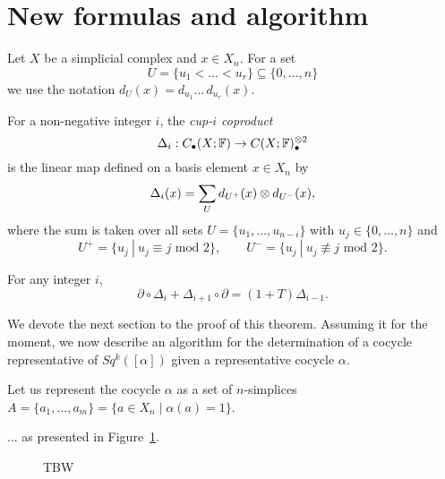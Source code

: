 
\section{New formulas and algorithm} \label{s:new stuff}

Let $X$ be a simplicial complex and $x \in X_n$. For a set
\begin{equation*}
U = \{u_1 < \dots < u_r\} \subseteq \{0, \dots, n\}
\end{equation*}
we use the notation $d_U(x) = d_{u_1} \ldots\, d_{u_r}(x)$.

\begin{definition} \label{d:cup-i coproducts}	
	For a non-negative integer $i$, the \textit{cup-$i$ coproduct}
	\begin{equation*}
	\Delta_i : C_\bullet(X; \mathbb{F}) \to C(X; \mathbb{F})^{\otimes 2}_\bullet
	\end{equation*}
	is the linear map defined on a basis element $x \in X_n$ by
	\begin{equation} \label{equation: simplicial cup-i coproducts}
	\Delta_i(x) = \sum_U d_{U^+}(x) \otimes d_{U^-}(x),
	\end{equation}
	where the sum is taken over all sets $U = \{u_1, \dots, u_{n-i}\}$ with $u_j \in \{0, \dots, n\}$ and
	\begin{equation*}
	U^+ = \{u_j\ |\ u_j \equiv j \text{ mod } 2\}, \qquad
	U^- = \{u_j\ |\ u_j \not\equiv j \text{ mod } 2\}.
	\end{equation*}
\end{definition}

\begin{theorem} \label{t:main theorem}
	For any integer $i$,
	\begin{equation} \label{eq: cup-i coproducts boundary relation}
	\partial \circ \Delta_{i} + \Delta_{i+1} \circ \partial = (1 +T ) \Delta_{i-1}.
	\end{equation}
\end{theorem}

We devote the next section to the proof of this theorem.
Assuming it for the moment, we now describe an algorithm for the determination of a cocycle representative of $Sq^k([\alpha])$ given a representative cocycle $\alpha$.

Let us represent the cocycle $\alpha$ as a set of $n$-simplices $A = \{a_1, \dots, a_m\} = \{a \in X_n \mid \alpha(a) = 1\}$.


... as presented in Figure~\ref{f:algorithm}.

\begin{figure}
	
	\caption{TBW}
	\label{f:algorithm}
\end{figure}